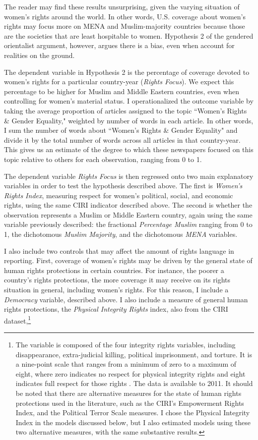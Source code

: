 \documentclass[11pt, oneside]{article}
\begin{document}
The reader may find these results unsurprising, given the varying situation of women's rights around the world. In other words, U.S. coverage about women's rights may focus more on MENA and Muslim-majority countries because those are the societies that are least hospitable to women. Hypothesis 2 of the gendered orientalist argument, however, argues there is a bias, even when account for realities on the ground.

The dependent variable in Hypothesis 2 is the percentage of coverage devoted to women's rights for a particular country-year (\emph{Rights Focus}).  We expect this percentage to be higher for Muslim and Middle Eastern countries, even when controlling for women's material status. I operationalized the outcome variable by taking the average proportion of articles assigned to the topic ``Women's Rights \& Gender Equality," weighted by number of words in each article. In other words, I sum the number of words about ``Women's Rights \& Gender Equality" and divide it by the total number of words across all articles in that country-year.  This gives us an estimate of the degree to which these newspapers focused on this topic relative to others for each observation, ranging from 0 to 1.

The dependent variable \emph{Rights Focus} is then regressed onto two main explanatory variables in order to test the hypothesis described above. The first is \emph{Women's Rights Index}, measuring respect for women's political, social, and economic rights, using the same CIRI indicator described above. The second is whether the observation represents a Muslim or Middle Eastern country, again using the same variable previously described: the fractional \emph{Percentage Muslim} ranging from 0 to 1, the dichotomous \emph{Muslim Majority}, and the dichotomous \emph{MENA} variables. 

I also include two controls that may affect the amount of rights language in reporting. First, coverage of women's rights may be driven by the general state of human rights protections in certain countries. For instance, the poorer a country's rights protections, the more coverage it may receive on its rights situation in general, including women's rights. For this reason, I include a \emph{Democracy} variable, described above. I also include a measure of general human rights protections, the \emph{Physical Integrity Rights} index, also from the CIRI dataset,\footnote{The variable is composed of the four integrity rights variables, including disappearance, extra-judicial killing, political imprisonment, and torture. It is a nine-point scale that ranges from a minimum of zero to a maximum of eight, where zero indicates no respect for physical integrity rights and eight indicates full respect for those rights \cite{cingranelli2012}. The data is available to 2011. It should be noted that there are alternative measures for the state of human rights protections used in the literature, such as the CIRI's Empowerment Rights Index, and the Political Terror Scale measures. I chose the Physical Integrity Index in the models discussed below, but I also estimated models using these two alternative measures, with the same substantive results.}
\end{document}
